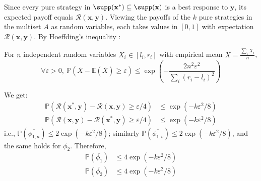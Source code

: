Since every pure strategy in $\supp(\mathbf{x}^*) \subseteq \supp(\mathbf{x})$ is a best response to $\mathbf{y}$, its expected payoff equals $\mathcal{R}(\mathbf{x}, \mathbf{y})$. Viewing the payoffs of the $k$ pure strategies in the multiset $A$ as random variables, each takes values in $[0, 1]$ with expectation $\mathcal{R}(\mathbf{x}, \mathbf{y})$. By Hoeffding's inequality \cite[Theorem~2]{hoeffding63}:

\begin{lemma}
  For $n$ independent random variables $X_i \in [l_i, r_i]$ with empirical mean $\overline{X} = \frac{\sum_{i} X_i}{n}$,
  \[
    \forall \varepsilon > 0,\ \mathbb{P}(\overline{X} - \mathbb{E}(\overline{X}) \ge \varepsilon) \le \exp\left( -\frac{2n^2\varepsilon^2}{\sum_{i} (r_i - l_i)^2} \right)
  \]
\end{lemma}

We get:
\begin{align*}
  \mathbb{P}(\mathcal{R}(\mathbf{x}^*, \mathbf{y}) - \mathcal{R}(\mathbf{x}, \mathbf{y}) \ge \varepsilon / 4) & \le \exp(-k\varepsilon^2 / 8) \\
  \mathbb{P}(\mathcal{R}(\mathbf{x}, \mathbf{y}) - \mathcal{R}(\mathbf{x}^*, \mathbf{y}) \ge \varepsilon / 4) & \le \exp(-k\varepsilon^2 / 8)
\end{align*}
i.e., $\mathbb{P}(\overline{\phi_{1, a}}) \le 2\exp(-k\varepsilon^2 / 8)$; similarly $\mathbb{P}(\overline{\phi_{1, b}}) \le 2\exp(-k\varepsilon^2 / 8)$, and the same holds for $\phi_2$. Therefore,
\begin{align*}
  \mathbb{P}(\overline{\phi_1}) & \le 4\exp(-k\varepsilon^2 / 8) \\
  \mathbb{P}(\overline{\phi_2}) & \le 4\exp(-k\varepsilon^2 / 8)
\end{align*}

